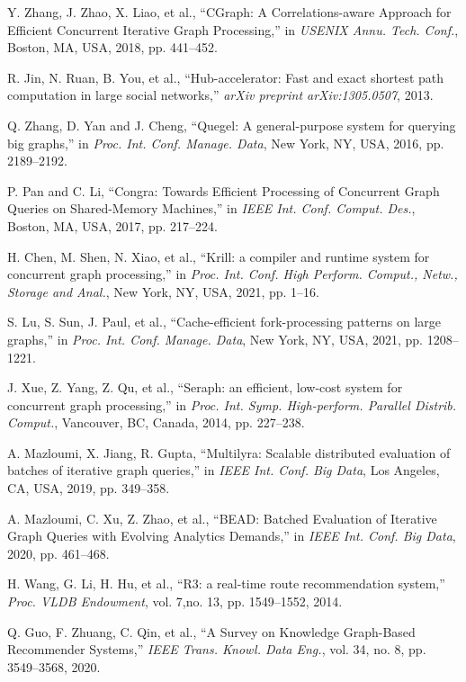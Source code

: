 \documentclass[lettersize,journal]{IEEEtran}
\begin{document}
\begin{thebibliography}{100}
Y. Zhang, J. Zhao, X. Liao, et al., ``{CGraph}: A Correlations-aware Approach for Efficient Concurrent Iterative Graph Processing,'' in \textit{USENIX Annu. Tech. Conf.}, Boston, MA, USA, 2018, pp. 441--452.

R. Jin, N. Ruan, B. You, et al., ``Hub-accelerator: Fast and exact shortest path computation in large social networks,'' \textit{arXiv preprint arXiv:1305.0507}, 2013.

Q. Zhang, D. Yan and J. Cheng, ``Quegel: A general-purpose system for querying big graphs,'' in \textit{Proc. Int. Conf. Manage. Data}, New York, NY, USA, 2016, pp. 2189--2192.

P. Pan and C. Li, ``Congra: Towards Efficient Processing of Concurrent Graph Queries on Shared-Memory Machines,'' in \textit{IEEE Int. Conf. Comput. Des.}, Boston, MA, USA, 2017, pp. 217--224.

H. Chen, M. Shen, N. Xiao, et al., ``Krill: a compiler and runtime system for concurrent graph processing,'' in \textit{Proc. Int. Conf. High Perform. Comput., Netw., Storage and Anal.}, New York, NY, USA, 2021, pp. 1--16.

S. Lu, S. Sun, J. Paul, et al., ``Cache-efficient fork-processing patterns on large graphs,'' in \textit{Proc. Int. Conf. Manage. Data}, New York, NY, USA, 2021, pp. 1208--1221.

J. Xue, Z. Yang, Z. Qu, et al., ``Seraph: an efficient, low-cost system for concurrent graph processing,'' in \textit{Proc. Int. Symp. High-perform. Parallel Distrib. Comput.}, Vancouver, BC, Canada, 2014, pp. 227--238.

A. Mazloumi, X. Jiang, R. Gupta, ``Multilyra: Scalable distributed evaluation of batches of iterative graph queries,'' in \textit{IEEE Int. Conf. Big Data}, Los Angeles, CA, USA, 2019, pp. 349--358.

A. Mazloumi, C. Xu, Z. Zhao, et al., ``BEAD: Batched Evaluation of Iterative Graph Queries with Evolving Analytics Demands,'' in \textit{IEEE Int. Conf. Big Data}, 2020, pp. 461--468.

H. Wang, G. Li, H. Hu, et al., ``R3: a real-time route recommendation system,'' \textit{Proc. VLDB Endowment}, vol. 7,no. 13, pp. 1549--1552, 2014.

Q. Guo, F. Zhuang, C. Qin, et al., ``A Survey on Knowledge Graph-Based Recommender Systems,'' \textit{IEEE Trans. Knowl. Data Eng.}, vol. 34, no. 8, pp. 3549--3568, 2020.


\end{thebibliography}
\end{document}
